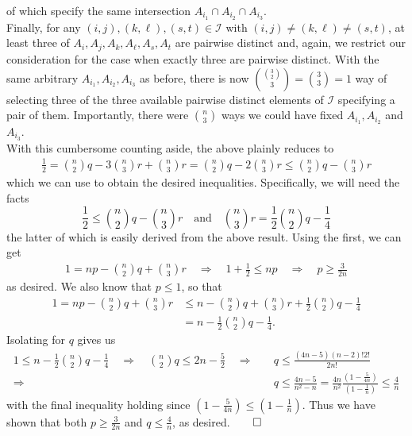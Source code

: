 \documentclass[10pt]{article}
\newcommand{\1}[1]{\mathbbm{1}_{#1}}
\newcommand{\nck}[2]{{#1\choose#2}}
\begin{document}
    of which specify the same intersection $A_{i_1}\cap A_{i_2}\cap A_{i_3}$.\\[5pt]
    Finally, for any $(i,j),(k,\ell),(s,t)\in\mathcal{I}$ with $(i,j)\neq(k,\ell)\neq (s,t)$, at least three of $A_i,A_j,A_k,A_\ell,A_s,A_t$ are pairwise distinct and, again,
    we restrict our consideration for the case when exactly three are pairwise distinct. With the same arbitrary $A_{i_1},A_{i_2},A_{i_3}$ as before, there is now $\nck{\nck{3}{2}}{3}=\nck{3}{3}=1$ way of selecting three of the three available pairwise distinct elements of $\mathcal{I}$ specifying a pair of them.
    Importantly, there were $\nck{n}{3}$ ways we could have fixed $A_{i_1},A_{i_2}$ and $A_{i_3}$.\\[5pt]
    With this cumbersome counting aside, the above plainly reduces to
    \begin{align*}
        \frac{1}{2}=\nck{n}{2}q-3\nck{n}{3}r+\nck{n}{3}r=\nck{n}{2}q-2\nck{n}{3}r\leq \nck{n}{2}q-\nck{n}{3}r
    \end{align*}
    which we can use to obtain the desired inequalities. Specifically, we will need the facts
    \[\frac{1}{2}\leq \nck{n}{2}q-\nck{n}{3}r\quad\text{and}\quad\nck{n}{3}r=\frac{1}{2}\nck{n}{2}q-\frac{1}{4}\]
    the latter of which is easily derived from the above result. Using the first, we can get
    \begin{align*}
        1=np-\nck{n}{2}q+\nck{n}{3}r\quad\Rightarrow\quad 1+\frac{1}{2}\leq np\quad\Rightarrow\quad p\geq \frac{3}{2n}
    \end{align*}
    as desired. We also know that $p\leq 1$, so that
    \begin{align*}
        1=np-\nck{n}{2}q+\nck{n}{3}r&\leq n-\nck{n}{2}q+\nck{n}{3}r+\frac{1}{2}\nck{n}{2}q-\frac{1}{4}\\
        &=n-\frac{1}{2}\nck{n}{2}q-\frac{1}{4}.
    \end{align*}
    Isolating for $q$ gives us
    \begin{align*}
        1\leq n-\frac{1}{2}\nck{n}{2}q-\frac{1}{4}\quad\Rightarrow\quad \nck{n}{2}q\leq 2n-\frac{5}{2}\quad\Rightarrow\quad &q\leq \frac{(4n-5)(n-2)!2!}{2n!}\\
        \Rightarrow\quad &q\leq \frac{4n-5}{n^2-n}=\frac{4n}{n^2}\frac{(1-\frac{5}{4n})}{(1-\frac{1}{n})}\leq \frac{4}{n}
    \end{align*}
    with the final inequality holding since $(1-\frac{5}{4n})\leq (1-\frac{1}{n})$. Thus we have shown that both $p\geq \frac{3}{2n}$ and $q\leq \frac{4}{n}$, as desired.\hfill{$\qed$}\\[5pt]
\end{document}
